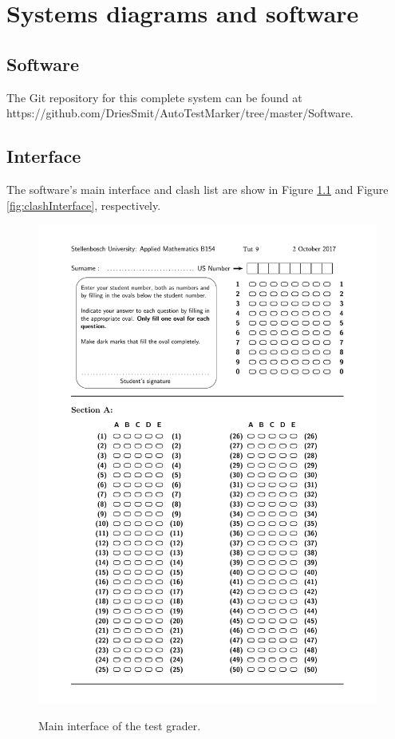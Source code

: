\chapter{Systems diagrams and software}
\label{ap:Algorithms}
\graphicspath{{Appendix4/Appendix4figures/}}

\section{Software}
The Git repository for this complete system can be found at\\https://github.com/DriesSmit/AutoTestMarker/tree/master/Software.

\section{Interface}
The software's main interface and clash list are show in Figure \ref{fig:mainInterface} and Figure \ref{fig:clashInterface}, respectively.

\begin{figure}
  \centering
  \includegraphics[width=14.2cm]{mainInterface}\\
  \caption{Main interface of the test grader.}
  \label{fig:mainInterface}
\end{figure}

